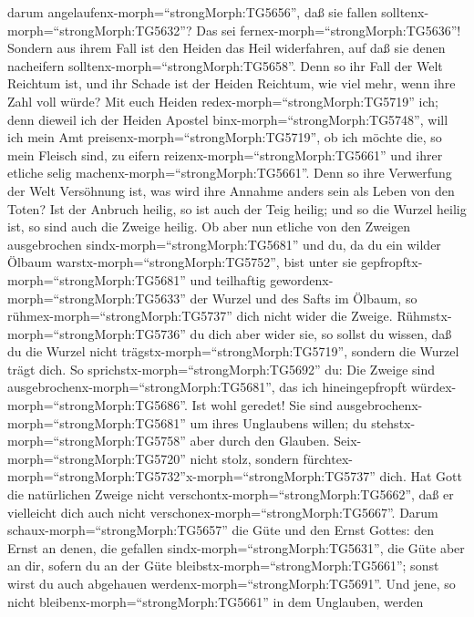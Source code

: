 darum angelaufenx-morph=``strongMorph:TG5656'', daß sie fallen
solltenx-morph=``strongMorph:TG5632''? Das sei
fernex-morph=``strongMorph:TG5636''! Sondern aus ihrem Fall ist den
Heiden das Heil widerfahren, auf daß sie denen nacheifern
solltenx-morph=``strongMorph:TG5658''.  Denn so ihr Fall
der Welt Reichtum ist, und ihr Schade ist der Heiden Reichtum, wie viel
mehr, wenn ihre Zahl voll würde?  Mit euch Heiden
redex-morph=``strongMorph:TG5719'' ich; denn dieweil ich der Heiden
Apostel binx-morph=``strongMorph:TG5748'', will ich mein Amt
preisenx-morph=``strongMorph:TG5719'',  ob ich möchte die,
so mein Fleisch sind, zu eifern reizenx-morph=``strongMorph:TG5661'' und
ihrer etliche selig machenx-morph=``strongMorph:TG5661''. 
Denn so ihre Verwerfung der Welt Versöhnung ist, was wird ihre Annahme
anders sein als Leben von den Toten?  Ist der Anbruch
heilig, so ist auch der Teig heilig; und so die Wurzel heilig ist, so
sind auch die Zweige heilig.  Ob aber nun etliche von den
Zweigen ausgebrochen sindx-morph=``strongMorph:TG5681'' und du, da du
ein wilder Ölbaum warstx-morph=``strongMorph:TG5752'', bist unter sie
gepfropftx-morph=``strongMorph:TG5681'' und teilhaftig
gewordenx-morph=``strongMorph:TG5633'' der Wurzel und des Safts im
Ölbaum,  so rühmex-morph=``strongMorph:TG5737'' dich nicht
wider die Zweige. Rühmstx-morph=``strongMorph:TG5736'' du dich aber
wider sie, so sollst du wissen, daß du die Wurzel nicht
trägstx-morph=``strongMorph:TG5719'', sondern die Wurzel trägt dich.
 So sprichstx-morph=``strongMorph:TG5692'' du: Die Zweige
sind ausgebrochenx-morph=``strongMorph:TG5681'', das ich hineingepfropft
würdex-morph=``strongMorph:TG5686''.  Ist wohl geredet! Sie
sind ausgebrochenx-morph=``strongMorph:TG5681'' um ihres Unglaubens
willen; du stehstx-morph=``strongMorph:TG5758'' aber durch den Glauben.
Seix-morph=``strongMorph:TG5720'' nicht stolz, sondern
fürchtex-morph=``strongMorph:TG5732''\textbar x-morph=``strongMorph:TG5737''
dich.  Hat Gott die natürlichen Zweige nicht
verschontx-morph=``strongMorph:TG5662'', daß er vielleicht dich auch
nicht verschonex-morph=``strongMorph:TG5667''.  Darum
schaux-morph=``strongMorph:TG5657'' die Güte und den Ernst Gottes: den
Ernst an denen, die gefallen sindx-morph=``strongMorph:TG5631'', die
Güte aber an dir, sofern du an der Güte
bleibstx-morph=``strongMorph:TG5661''; sonst wirst du auch abgehauen
werdenx-morph=``strongMorph:TG5691''.  Und jene, so nicht
bleibenx-morph=``strongMorph:TG5661'' in dem Unglauben, werden
